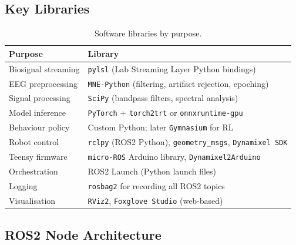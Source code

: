 \documentclass[11pt,a4paper]{article}
\begin{document}
\subsection{Key Libraries}

\begin{table}[H]
\centering
\caption{Software libraries by purpose.}
\label{tab:libraries}
\begin{tabularx}{\textwidth}{lX}
\toprule
\textbf{Purpose} & \textbf{Library} \\
\midrule
Biosignal streaming & \texttt{pylsl} (Lab Streaming Layer Python bindings) \\
EEG preprocessing & \texttt{MNE-Python} (filtering, artifact rejection, epoching) \\
Signal processing & \texttt{SciPy} (bandpass filters, spectral analysis) \\
Model inference & \texttt{PyTorch} + \texttt{torch2trt} or \texttt{onnxruntime-gpu} \\
Behaviour policy & Custom Python; later \texttt{Gymnasium} for RL \\
Robot control & \texttt{rclpy} (ROS2 Python), \texttt{geometry\_msgs}, \texttt{Dynamixel SDK} \\
Teensy firmware & \texttt{micro-ROS} Arduino library, \texttt{Dynamixel2Arduino} \\
Orchestration & ROS2 Launch (Python launch files) \\
Logging & \texttt{rosbag2} for recording all ROS2 topics \\
Visualisation & \texttt{RViz2}, \texttt{Foxglove Studio} (web-based) \\
\bottomrule
\end{tabularx}
\end{table}

\subsection{ROS2 Node Architecture}
\end{document}

